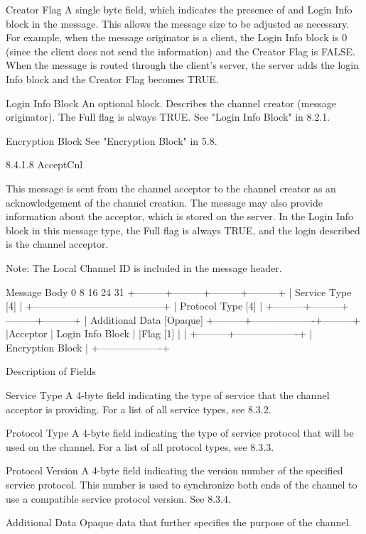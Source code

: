 \documentclass[titlepage,oneside]{book}
\begin{document}
Creator Flag
  A single byte field, which indicates the presence of and Login Info
  block in the message. This allows the message size to be adjusted as
  necessary. For example, when the message originator is a client, the
  Login Info block is 0 (since the client does not send the
  information) and the Creator Flag is FALSE. When the message is
  routed through the client's server, the server adds the login Info
  block and the Creator Flag becomes TRUE.

Login Info Block
  An optional block. Describes the channel creator (message
  originator). The Full flag is always TRUE. See "Login Info Block" in
  8.2.1.

Encryption Block
  See "Encryption Block" in 5.8.


8.4.1.8 AcceptCnl

This message is sent from the channel acceptor to the channel creator
as an acknowledgement of the channel creation. The message may also
provide information about the acceptor, which is stored on the server.
In the Login Info block in this message type, the Full flag is always
TRUE, and the login described is the channel acceptor.

Note: The Local Channel ID is included in the message header.

Message Body
0         8         16        24      31
+---------+---------+---------+---------+
|           Service Type [4]            |
+---------------------------------------+
|           Protocol Type [4]           |
+---------+---------+---------+---------+
| Additional Data [Opaque]
+---------+-------------------+---------+
|Acceptor | Login Info Block  |
|Flag [1] |                   |
+---------+-------------------+
          |  Encryption Block |
          +-------------------+

Description of Fields

Service Type
  A 4-byte field indicating the type of service that the channel
  acceptor is providing. For a list of all service types, see
  8.3.2.

Protocol Type
  A 4-byte field indicating the type of service protocol that will be
  used on the channel. For a list of all protocol types, see
  8.3.3.

Protocol Version
  A 4-byte field indicating the version number of the specified service
  protocol. This number is used to synchronize both ends of the channel
  to use a compatible service protocol version. See 
  8.3.4.

Additional Data
  Opaque data that further specifies the purpose of the channel.
\end{document}
